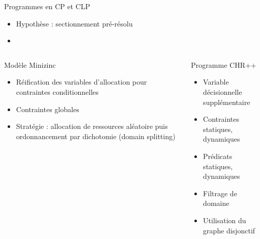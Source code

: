 \documentclass{beamer}
\begin{document}
\begin{frame}{Programmes en CP et CLP}

 \begin{minipage}{0.2\textwidth}
 \end{minipage}
 \hfill
  \begin{minipage}{0.79\textwidth}
        \begin{itemize}
        \item Hypothèse : sectionnement pré-résolu
        \item[]
    \end{itemize}
 \end{minipage} 
 \vspace{1.5mm}
    \begin{columns}[c]
\begin{column}{0.5\textwidth}
Modèle Minizinc
\begin{itemize}
    \item Réification des variables d'allocation pour contraintes conditionnelles
    \item Contraintes globales
    \item Stratégie : allocation de ressources aléatoire puis ordonnancement par dichotomie (domain splitting)
\end{itemize}
\end{column}
\vrule{}
\begin{column}{0.50\textwidth}
Programme CHR++
\begin{itemize}
        \item Variable décisionnelle supplémentaire 
        \item Contraintes statiques, dynamiques
        \item Prédicats statiques, dynamiques
        \item Filtrage de domaine
        \item Utilisation du graphe disjonctif
\end{itemize}
\end{column}
\end{columns}

\end{frame}

\end{document}
